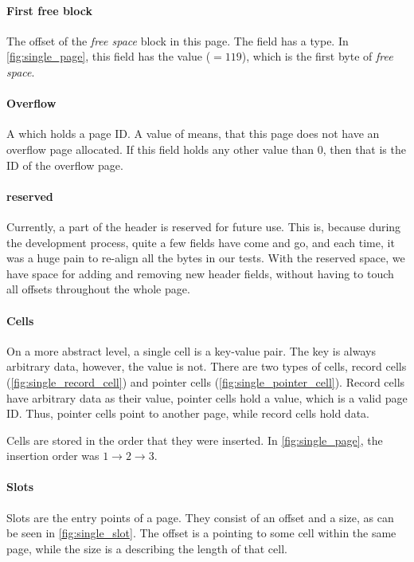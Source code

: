 \paragraph{First free block}
The offset of the \emph{free space} block in this page.
The field has a  type.
In \ref{fig:single_page}, this field has the value  ($= 119$), which is the first byte of \emph{free space}.

\paragraph{Overflow}
A  which holds a page ID.
A value of  means, that this page does not have an overflow page allocated.
If this field holds any other value than $0$, then that is the ID of the overflow page.

\paragraph{reserved}
Currently, a part of the header is reserved for future use.
This is, because during the development process, quite a few fields have come and go, and each time, it was a huge pain to re-align all the bytes in our tests.
With the reserved space, we have space for adding and removing new header fields, without having to touch all offsets throughout the whole page.

\paragraph{Cells}
On a more abstract level, a single cell is a key-value pair.
The key is always arbitrary data, however, the value is not.
There are two types of cells, record cells (\ref{fig:single_record_cell}) and pointer cells (\ref{fig:single_pointer_cell}).
Record cells have arbitrary data as their value, pointer cells hold a  value, which is a valid page ID.
Thus, pointer cells point to another page, while record cells hold data.

Cells are stored in the order that they were inserted.
In \ref{fig:single_page}, the insertion order was $1 \rightarrow 2 \rightarrow 3$.

\paragraph{Slots}
Slots are the entry points of a page.
They consist of an offset and a size, as can be seen in \ref{fig:single_slot}.
The offset is a  pointing to some cell within the same page, while the size is a  describing the length of that cell.

